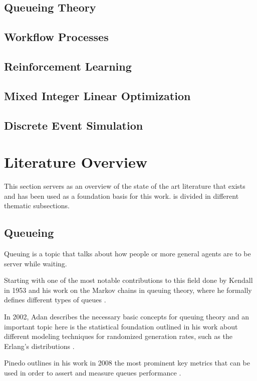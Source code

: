\documentclass{seal_thesis}
\begin{document}
\subsection{Queueing Theory}
\subsection{Workflow Processes}
\subsection{Reinforcement Learning}
\subsection{Mixed Integer Linear Optimization}
\subsection{Discrete Event Simulation}
\section{Literature Overview}
\label{sec:literature_overview}

This section servers as an overview of the state of the art literature that exists and has been used as a foundation basis for this work.  is divided in different thematic subsections.

\subsection{Queueing}

Queuing is a topic that talks about how people or more general agents are to be server while waiting.

Starting with one of the most notable contributions to this field done by Kendall in 1953 and his work on the Markov chains in queuing theory, where he formally defines different types of queues \cite{Kendall1953}.

In 2002, Adan describes the necessary basic concepts for queuing theory and an important topic here is the statistical foundation outlined in his work about different modeling techniques for randomized generation rates, such as the Erlang's distributions \cite{Adan2002}.

Pinedo outlines in his work in 2008 the most prominent key metrics that can be used in order to assert and measure queues performance \cite{Pinedo2008}.
\end{document}
